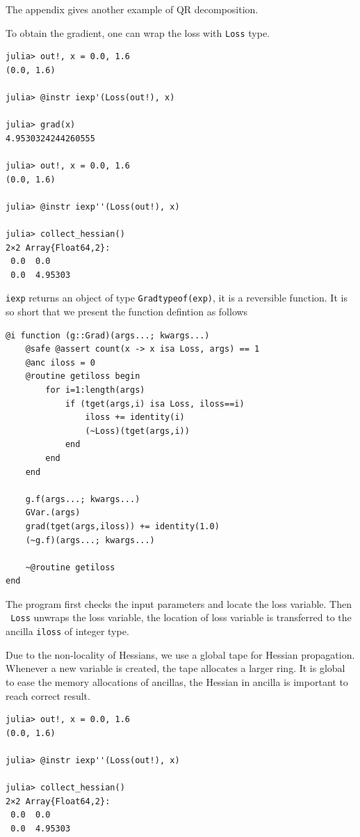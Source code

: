 \documentclass{article}
\newcommand{\<}{\langle}
\renewcommand{\>}{\rangle}
\begin{document}
The appendix gives another example of QR decomposition.

To obtain the gradient, one can wrap the loss with \texttt{Loss} type.

\begin{minipage}{.44\textwidth}
\begin{lstlisting}
julia> out!, x = 0.0, 1.6
(0.0, 1.6)

julia> @instr iexp'(Loss(out!), x)

julia> grad(x)
4.9530324244260555

julia> out!, x = 0.0, 1.6
(0.0, 1.6)

julia> @instr iexp''(Loss(out!), x)

julia> collect_hessian()
2×2 Array{Float64,2}:
 0.0  0.0
 0.0  4.95303
\end{lstlisting}
\end{minipage}

\texttt{iexp\textquotesingle} returns an object of type \texttt{Grad{typeof(exp)}}, it is a reversible function.
It is so short that we present the function defintion as follows

\begin{minipage}{.44\textwidth}
\begin{lstlisting}
@i function (g::Grad)(args...; kwargs...)
    @safe @assert count(x -> x isa Loss, args) == 1
    @anc iloss = 0
    @routine getiloss begin
        for i=1:length(args)
            if (tget(args,i) isa Loss, iloss==i)
                iloss += identity(i)
                (~Loss)(tget(args,i))
            end
        end
    end

    g.f(args...; kwargs...)
    GVar.(args)
    grad(tget(args,iloss)) += identity(1.0)
    (~g.f)(args...; kwargs...)

    ~@routine getiloss
end
\end{lstlisting}
\end{minipage}

The program first checks the input parameters and locate the loss variable.
Then \texttt{~Loss} unwraps the loss variable, the location of loss variable is transferred to the ancilla \texttt{iloss} of integer type.

Due to the non-locality of Hessians, we use a global tape for Hessian propagation. Whenever a new variable is created, the tape allocates a larger ring.
It is global to ease the memory allocations of ancillas, the Hessian in ancilla is important to reach correct result.
\begin{minipage}{.44\textwidth}
\begin{lstlisting}
julia> out!, x = 0.0, 1.6
(0.0, 1.6)

julia> @instr iexp''(Loss(out!), x)

julia> collect_hessian()
2×2 Array{Float64,2}:
 0.0  0.0
 0.0  4.95303
\end{lstlisting}
\end{minipage}
\end{document}
